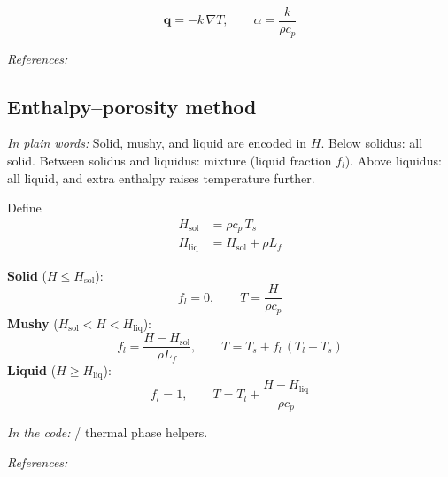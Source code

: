 \documentclass[11pt,a4paper]{article}
\newcommand{\vect}[1]{\mathbf{#1}}
\newcommand{\fref}[1]{\par\smallskip\noindent\textit{References:} #1\par}
\newcommand{\code}[1]{\texttt{\detokenize{#1}}}
\newcommand{\newbie}[1]{\par\medskip\noindent\textit{In plain words:} #1\par\medskip}
\newcommand{\incode}[1]{\par\smallskip\noindent\textit{In the code:} #1\par}
\begin{document}
\begin{equation}
  \vect{q} = -k\,\nabla T, \qquad
  \alpha = \frac{k}{\rho c_p}
\end{equation}
\fref{\cite{Incropera2007,Carslaw1959}}

\subsection{Enthalpy--porosity method}
\newbie{Solid, mushy, and liquid are encoded in $H$. Below solidus: all solid.
Between solidus and liquidus: mixture (liquid fraction $f_l$). Above liquidus:
all liquid, and extra enthalpy raises temperature further.}

Define
\begin{align}
  H_{\mathrm{sol}} &= \rho c_p\, T_s \\
  H_{\mathrm{liq}} &= H_{\mathrm{sol}} + \rho L_f
\end{align}

\begin{center}
\end{center}

\textbf{Solid} ($H \le H_{\mathrm{sol}}$):
\begin{equation}
  f_l = 0, \qquad T = \frac{H}{\rho c_p}
\end{equation}
\textbf{Mushy} ($H_{\mathrm{sol}} < H < H_{\mathrm{liq}}$):
\begin{equation}
  f_l = \frac{H - H_{\mathrm{sol}}}{\rho L_f}, \qquad
  T = T_s + f_l\,(T_l - T_s)
\end{equation}
\textbf{Liquid} ($H \ge H_{\mathrm{liq}}$):
\begin{equation}
  f_l = 1, \qquad T = T_l + \frac{H - H_{\mathrm{liq}}}{\rho c_p}
\end{equation}
\incode{\code{kernels.update_phase} / thermal phase helpers.}
\fref{\cite{Voller1987,Brent1988,waam_twin2025}}
\end{document}
